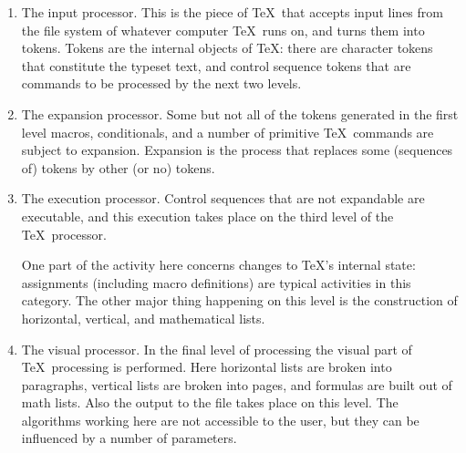 \documentclass[letterpaper]{book}
\begin{document}
\begin{enumerate}\item
The input processor. This is the piece of \TeX\ that
accepts input lines from the file system of whatever computer
\TeX\ runs on, and turns them into tokens.
Tokens are the internal objects of \TeX:
there are character tokens that constitute the typeset
text, and control sequence tokens that are commands 
to be processed by the next two levels.
\item The expansion processor. 
Some but not all of the tokens generated in the first level
\ldash macros, conditionals, and a number
of primitive \TeX\ commands \rdash  are subject to expansion.
Expansion is the process that replaces some (sequences of)
tokens by other (or no) tokens.
\item The execution processor. 
Control sequences that are not expandable are executable,
and this execution takes place on the third level of the
\TeX\ processor.

One part of the activity here concerns changes to
\TeX's internal state: assignments (including
macro definitions) are typical activities in this
category. The other major thing happening on this level
is the construction of horizontal, vertical, and
mathematical lists.
\item The visual processor. 
In the final level of processing
the visual part of \TeX\ processing is performed. Here
horizontal lists are broken into paragraphs, 
vertical lists are broken into pages,
and  formulas are built out of math lists. 
Also the output to the  file takes place on this level.
The algorithms working here are not accessible to the user,
but they can be influenced by a number of parameters.
\end{enumerate}
\end{document}
